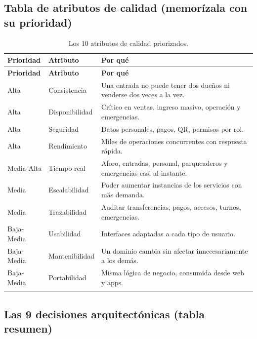 \documentclass[12pt,a4paper]{article}
\begin{document}
\subsection{Tabla de atributos de calidad (memorízala con su prioridad)}

\begin{longtable}{p{2.4cm}p{2.7cm}p{7.6cm}}
\toprule
\textbf{Prioridad} & \textbf{Atributo} & \textbf{Por qué}\\
\midrule
\endfirsthead
\toprule
\textbf{Prioridad} & \textbf{Atributo} & \textbf{Por qué}\\
\midrule
\endhead
Alta & Consistencia & Una entrada no puede tener dos dueños ni venderse dos veces a la vez.\\
Alta & Disponibilidad & Crítico en ventas, ingreso masivo, operación y emergencias.\\
Alta & Seguridad & Datos personales, pagos, QR, permisos por rol.\\
Alta & Rendimiento & Miles de operaciones concurrentes con respuesta rápida.\\
Media-Alta & Tiempo real & Aforo, entradas, personal, parqueaderos y emergencias casi al instante.\\
Media & Escalabilidad & Poder aumentar instancias de los servicios con más demanda.\\
Media & Trazabilidad & Auditar transferencias, pagos, accesos, turnos, emergencias.\\
Baja-Media & Usabilidad & Interfaces adaptadas a cada tipo de usuario.\\
Baja-Media & Mantenibilidad & Un dominio cambia sin afectar innecesariamente a los demás.\\
Baja-Media & Portabilidad & Misma lógica de negocio, consumida desde web y apps.\\
\bottomrule
\caption{Los 10 atributos de calidad priorizados.}
\end{longtable}

\subsection{Las 9 decisiones arquitectónicas (tabla resumen)}
\end{document}

